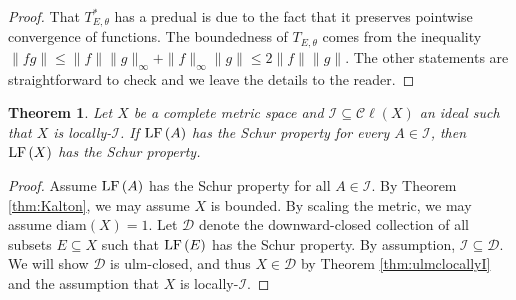 \documentclass[12pt]{amsart}
\newtheorem{theorem}{Theorem}[section]
\theoremstyle{definition}
\numberwithin{equation}{section}
\def \D {\mathcal{D}}
\def \I {\mathcal{I}}
\def \sbs {\subseteq}
\newcommand{\Cl}[1]{\mathcal{C}\ell\left(#1\right)}
\newcommand{\diam}[1]{\mathrm{diam}\left( #1 \right)}
\begin{document}
\begin{proof}
That $T_{E,\theta}^*$ has a predual is due to the fact that it preserves pointwise convergence of functions. The boundedness of $T_{E,\theta}$ comes from the inequality $\|fg\| \leq \|f\|\|g\|_\infty + \|f\|_\infty\|g\| \leq 2\|f\|\|g\|$. The other statements are straightforward to check and we leave the details to the reader.
\end{proof}

\begin{theorem} \label{thm:Schur}
Let $X$ be a complete metric space and $\I \sbs \Cl{X}$ an ideal such that $X$ is locally-$\I$. If $\LF{A}$ has the Schur property for every $A \in \I$, then $\LF{X}$ has the Schur property.
\end{theorem}

\begin{proof}
Assume $\LF{A}$ has the Schur property for all $A \in \I$. By Theorem \ref{thm:Kalton}, we may assume $X$ is bounded. By scaling the metric, we may assume $\diam{X} = 1$. Let $\D$ denote the downward-closed collection of all subsets $E \sbs X$ such that $\LF{E}$ has the Schur property. By assumption, $\I \sbs \D$. We will show $\D$ is ulm-closed, and thus $X \in \D$ by Theorem \ref{thm:ulmclocallyI} and the assumption that $X$ is locally-$\I$.


\end{proof}
\end{document}
